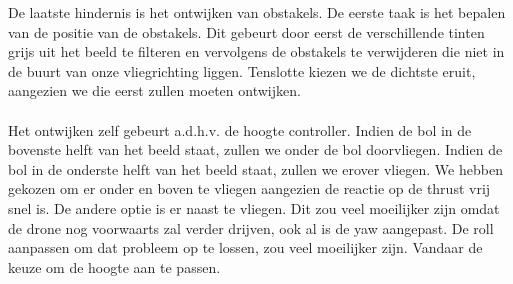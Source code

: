 \noindent
De laatste hindernis is het ontwijken van obstakels. De eerste taak is het bepalen van de positie van de obstakels. Dit gebeurt door eerst de verschillende tinten grijs uit het beeld te filteren en vervolgens de obstakels te verwijderen die niet in de buurt van onze vliegrichting liggen. Tenslotte kiezen we de dichtste eruit, aangezien we die eerst zullen moeten ontwijken.
\\
\\
Het ontwijken zelf gebeurt a.d.h.v. de hoogte controller. Indien de bol in de bovenste helft van het beeld staat, zullen we onder de bol doorvliegen. Indien de bol in de onderste helft van het beeld staat, zullen we erover vliegen. We hebben gekozen om er onder en boven te vliegen aangezien de reactie op de thrust vrij snel is. De andere optie is er naast te vliegen. Dit zou veel moeilijker zijn omdat de drone nog voorwaarts zal verder drijven, ook al is de yaw aangepast. De roll aanpassen om dat probleem op te lossen, zou veel moeilijker zijn. Vandaar de keuze om de hoogte aan te passen.